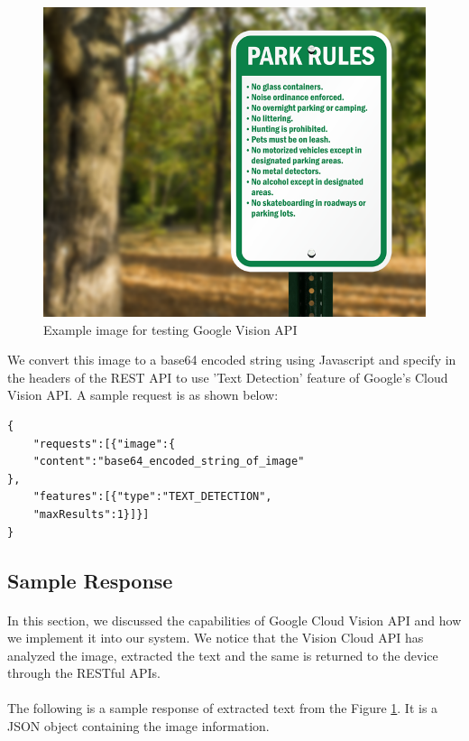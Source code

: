 \documentclass[12pt]{article}
\begin{document}
\begin{figure}[H]
	\centering
	\includegraphics[width=1.0\linewidth]{media/request_sample.png}
	\caption{Example image for testing Google Vision API}
	\label{fig:request_sample}
\end{figure} 

We convert this image to a base64 encoded string using Javascript and specify in the headers of the REST API to use 'Text Detection' feature of Google's Cloud Vision API. A sample request is as shown below:

\begin{lstlisting}
{
	"requests":[{"image":{
	"content":"base64_encoded_string_of_image"
},	
	"features":[{"type":"TEXT_DETECTION",
	"maxResults":1}]}]
}
\end{lstlisting}

\subsection{Sample Response}

\paragraph{} In this section, we discussed the capabilities of Google Cloud Vision API and how we implement it into our system. We notice that the Vision Cloud API has analyzed the image, extracted the text and the same is returned to the device through the RESTful APIs.  

\paragraph{}The following is a sample response of extracted text from the Figure \ref{fig:request_sample}. It is a JSON object containing the image information.
\end{document}
